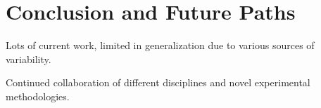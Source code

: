 \documentclass{article}
\begin{document}
\section{Conclusion and Future Paths}
Lots of current work, limited in generalization due to various sources of variability.

Continued collaboration of different disciplines and novel experimental methodologies.
\vfill\pagebreak




\end{document}
